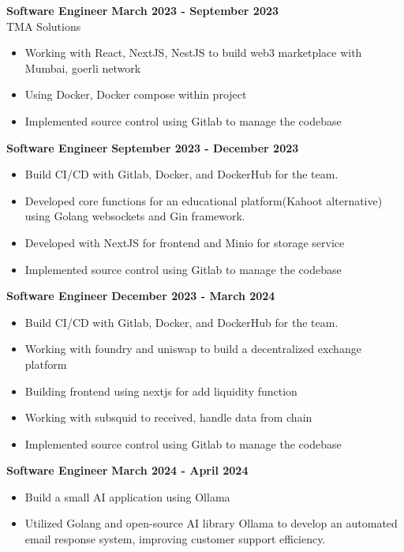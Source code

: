 \documentclass{article}
\newenvironment{bullets}{
    \begin{itemize}
    \setlength{\itemsep}{0pt}
    \setlength{\parskip}{0pt}
    \setlength{\parsep}{0pt}
}{
    \end{itemize}
}
\begin{document}
\textbf{Software Engineer} \hfill \textbf{March 2023 - September 2023}\\
TMA Solutions

\begin{bullets}
    \item Working with React, NextJS, NestJS to build web3 marketplace with Mumbai, goerli network
    \item Using Docker, Docker compose within project
    \item Implemented source control using Gitlab to manage the codebase
\end{bullets}

\textbf{Software Engineer} \hfill \textbf{September 2023 - December 2023}\\
\begin{bullets}
    \item Build CI/CD with Gitlab, Docker, and DockerHub for the team.
    \item Developed core functions for an educational platform(Kahoot alternative) using Golang websockets and Gin framework.
    \item Developed with NextJS for frontend and Minio for storage service
    \item Implemented source control using Gitlab to manage the codebase
\end{bullets}

\textbf{Software Engineer} \hfill 
\textbf{December 2023 - March 2024}\\
\begin{bullets}
    \item Build CI/CD with Gitlab, Docker, and DockerHub for the team.
    \item Working with foundry and uniswap to build a decentralized exchange platform
    \item Building frontend using nextjs for add liquidity function
    \item Working with subsquid to received, handle data from chain 
    \item Implemented source control using Gitlab to manage the codebase
\end{bullets}

\textbf{Software Engineer} \hfill 
\textbf{March 2024 - April 2024}\\
\begin{bullets}
    \item Build a small AI application using Ollama
    \item Utilized Golang and open-source AI library Ollama to develop an automated email response system, improving customer support efficiency.
\end{bullets}
\end{document}
